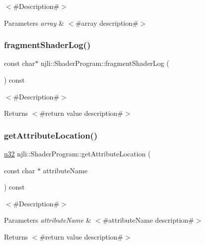 $<$\#\+Description\#$>$


\begin{DoxyParams}{Parameters}
{\em array} & $<$\#array description\#$>$ \\
\hline
\end{DoxyParams}
\mbox{\label{classnjli_1_1_shader_program_a3f4444c90822c63fee69261f476774b7}} 
\subsubsection{\texorpdfstring{fragment\+Shader\+Log()}{fragmentShaderLog()}}
{\footnotesize\ttfamily const char$\ast$ njli\+::\+Shader\+Program\+::fragment\+Shader\+Log (\begin{DoxyParamCaption}{ }\end{DoxyParamCaption}) const}

$<$\#\+Description\#$>$

\begin{DoxyReturn}{Returns}
$<$\#return value description\#$>$ 
\end{DoxyReturn}
\mbox{\label{classnjli_1_1_shader_program_a44caba1039485701689f734de28462e7}} 
\subsubsection{\texorpdfstring{get\+Attribute\+Location()}{getAttributeLocation()}}
{\footnotesize\ttfamily \mbox{\hyperlink{_util_8h_a10e94b422ef0c20dcdec20d31a1f5049}{u32}} njli\+::\+Shader\+Program\+::get\+Attribute\+Location (\begin{DoxyParamCaption}\item[{const char $\ast$}]{attribute\+Name }\end{DoxyParamCaption}) const\hspace{0.3cm}{\ttfamily [protected]}}

$<$\#\+Description\#$>$


\begin{DoxyParams}{Parameters}
{\em attribute\+Name} & $<$\#attribute\+Name description\#$>$\\
\hline
\end{DoxyParams}
\begin{DoxyReturn}{Returns}
$<$\#return value description\#$>$ 
\end{DoxyReturn}
\mbox{\label{classnjli_1_1_shader_program_a61698287de4dadfd88151f40038569cf}} 
